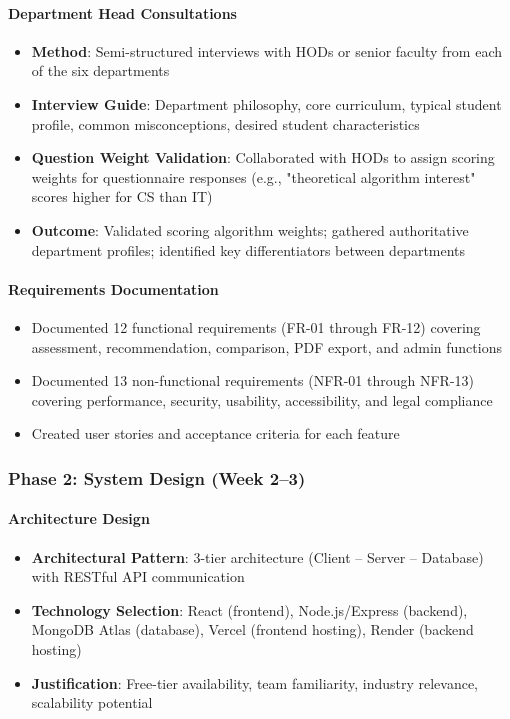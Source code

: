\documentclass[12pt, a4paper]{article}
\begin{document}
\paragraph{Department Head Consultations}
\begin{itemize}[leftmargin=1.5em, itemsep=3pt]
    \item \textbf{Method}: Semi-structured interviews with HODs or senior faculty from each of the six departments
    \item \textbf{Interview Guide}: Department philosophy, core curriculum, typical student profile, common misconceptions, desired student characteristics
    \item \textbf{Question Weight Validation}: Collaborated with HODs to assign scoring weights for questionnaire responses (e.g., "theoretical algorithm interest" scores higher for CS than IT)
    \item \textbf{Outcome}: Validated scoring algorithm weights; gathered authoritative department profiles; identified key differentiators between departments
\end{itemize}

\paragraph{Requirements Documentation}
\begin{itemize}[leftmargin=1.5em, itemsep=3pt]
    \item Documented 12 functional requirements (FR-01 through FR-12) covering assessment, recommendation, comparison, PDF export, and admin functions
    \item Documented 13 non-functional requirements (NFR-01 through NFR-13) covering performance, security, usability, accessibility, and legal compliance
    \item Created user stories and acceptance criteria for each feature
\end{itemize}

\subsubsection*{Phase 2: System Design (Week 2--3)}

\paragraph{Architecture Design}
\begin{itemize}[leftmargin=1.5em, itemsep=3pt]
    \item \textbf{Architectural Pattern}: 3-tier architecture (Client -- Server -- Database) with RESTful API communication
    \item \textbf{Technology Selection}: React (frontend), Node.js/Express (backend), MongoDB Atlas (database), Vercel (frontend hosting), Render (backend hosting)
    \item \textbf{Justification}: Free-tier availability, team familiarity, industry relevance, scalability potential
\end{itemize}
\end{document}
